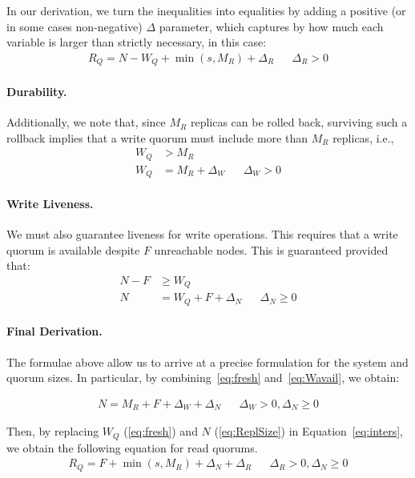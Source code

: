 In our derivation, we turn the inequalities into equalities by
adding a positive (or in some cases non-negative) $\Delta$
parameter, which captures by how much each variable is larger
than strictly necessary, in this case:
\begin{align} \label{eq:inters2}
  R_Q = N - W_Q + \min(s, M_R) + \Delta_R && \Delta_R > 0
\end{align}

\paragraph{Durability.}

Additionally, we note that, since $M_R$ replicas can be rolled
back, surviving such a rollback implies that a write quorum must
include more than $M_R$ replicas, i.e.,
\begin{align}
    W_Q &> M_R \nonumber \\
    W_Q &= M_R + \Delta_W && \Delta_W > 0 \label{eq:fresh}
\end{align}

\paragraph{Write Liveness.}
We must also guarantee liveness for write operations. This
requires that a write quorum is available despite $F$ unreachable
nodes. This is guaranteed provided that:
\begin{align}
    N - F &\geq W_Q \nonumber \\
    N &= W_Q + F + \Delta_N && \Delta_N \geq 0  \label{eq:Wavail}
\end{align}


\paragraph{Final Derivation.}
The formulae above allow us to arrive at a precise formulation
for the system and quorum sizes. In particular, by
combining~\ref{eq:fresh} and~\ref{eq:Wavail}, we obtain:

\begin{align} \label{eq:ReplSize}
  N = M_R + F + \Delta_W + \Delta_N && \Delta_W > 0, \Delta_N \geq 0
\end{align}

Then, by replacing $W_Q$ (\ref{eq:fresh}) and $N$
(\ref{eq:ReplSize}) in Equation~\ref{eq:inters}, we obtain the
following equation for read quorums.
\begin{align}\label{eq:ReadSize}
  R_Q = F + \min(s, M_R) + \Delta_N + \Delta_R && \Delta_R > 0, \Delta_N \geq 0
\end{align}


